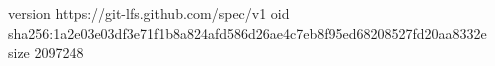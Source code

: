 version https://git-lfs.github.com/spec/v1
oid sha256:1a2e03e03df3e71f1b8a824afd586d26ae4c7eb8f95ed68208527fd20aa8332e
size 2097248
